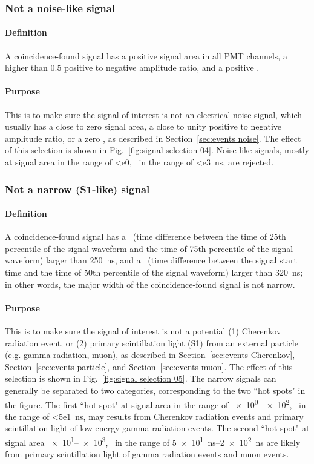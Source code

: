 \subsubsection{Not a noise-like signal}
\paragraph{Definition}
A coincidence-found signal has a positive signal area in all PMT channels, a higher than \num{0.5} positive to negative amplitude ratio,  and a positive \rpd .
\paragraph{Purpose}
This is to make sure the signal of interest is not an electrical noise signal, which usually has a close to zero signal area, a close to unity positive to negative amplitude ratio, or a zero \rpd , as described in Section~\ref{sec:events noise}. The effect of this selection is shown in Fig.~\ref{fig:signal selection 04}. Noise-like signals, mostly at signal area in the range of \SI{<e0}{\phe}, \rpd\ in the range of \SI{<e3}{\ns}, are rejected.  

\subsubsection{Not a narrow (S1-like) signal}
\label{cuts:S1}
\paragraph{Definition}
A coincidence-found signal has a \stw\ (time difference between the time of 25th percentile of the signal waveform and the time of 75th percentile of the signal waveform) larger than \SI{250}{\ns}, and  a \shw\ (time difference between the signal start time and the time of 50th percentile of the signal waveform) larger than \SI{320}{\ns}; in other words, the major width of the coincidence-found signal is not narrow. 
\paragraph{Purpose}
This is to make sure the signal of interest is not a potential (1) Cherenkov radiation event, or (2) primary scintillation light (S1) from an external particle (e.g. gamma radiation, muon), as described in Section~\ref{sec:events Cherenkov}, Section~\ref{sec:events particle}, and Section~\ref{sec:events muon}. The effect of this selection is shown in Fig.~\ref{fig:signal selection 05}. The narrow signals can generally be separated to two categories, corresponding to the two ``hot spots" in the figure. The first ``hot spot" at signal area in the range of \SIrange{e0}{e2}{\phe}, \rpd\ in the range of \SI{<5e1}{\ns}, may results from Cherenkov radiation events and primary scintillation light of low energy gamma radiation events. The second ``hot spot" at signal area \SIrange{e1}{e3}{\phe}, \rpd\ in the range of \SIrange{5e1}{2e2}{\ns} are likely from primary scintillation light of gamma radiation events and muon events. 

